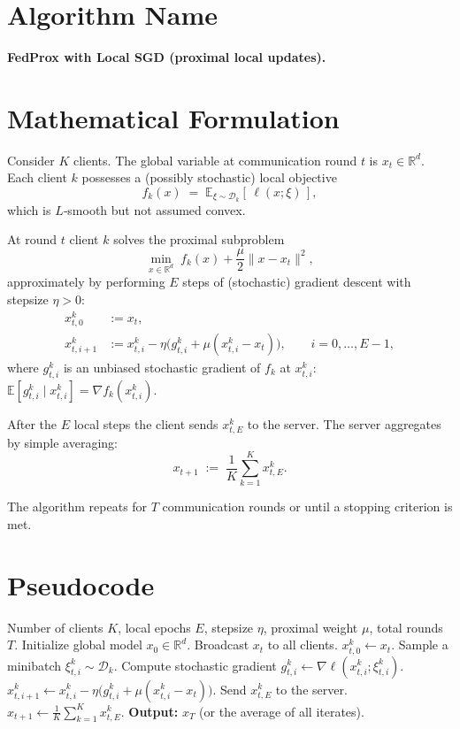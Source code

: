 \documentclass{article}
\newcommand{\EE}{\mathbb{E}}
\newcommand{\RR}{\mathbb{R}}
\begin{document}
\section*{Algorithm Name}
\textbf{FedProx with Local SGD (proximal local updates).}

\section*{Mathematical Formulation}
Consider $K$ clients.  The global variable at communication round $t$ is $x_t\in\RR^d$.  
Each client $k$ possesses a (possibly stochastic) local objective 
\[
f_k(x)\;=\;\EE_{\xi\sim\mathcal{D}_k}[\,\ell(x;\xi)\,],
\]
which is $L$‑smooth but not assumed convex.  

At round $t$ client $k$ solves the proximal subproblem
\[
\min_{x\in\RR^d}\; f_k(x)+\frac{\mu}{2}\|x-x_t\|^2,
\tag{1}
\]
approximately by performing $E$ steps of (stochastic) gradient descent with stepsize $\eta>0$:
\[
\begin{aligned}
x_{t,0}^{k} &:= x_t,\\
x_{t,i+1}^{k} &:= x_{t,i}^{k} - \eta\bigl(g_{t,i}^{k}+ \mu (x_{t,i}^{k}-x_t)\bigr),\qquad i=0,\dots,E-1,
\end{aligned}
\tag{2}
\]
where $g_{t,i}^{k}$ is an unbiased stochastic gradient of $f_k$ at $x_{t,i}^{k}$:
$\EE[g_{t,i}^{k}\mid x_{t,i}^{k}]=\nabla f_k(x_{t,i}^{k})$.  

After the $E$ local steps the client sends $x_{t,E}^{k}$ to the server.  
The server aggregates by simple averaging:
\[
x_{t+1}\;:=\;\frac1K\sum_{k=1}^{K}x_{t,E}^{k}.
\tag{3}
\]

The algorithm repeats for $T$ communication rounds or until a stopping criterion is met.

\section*{Pseudocode}
\begin{algorithm}[H]
\caption{FedProx with Local SGD}
\begin{algorithmic}[1]
\Require Number of clients $K$, local epochs $E$, stepsize $\eta$, proximal weight $\mu$, total rounds $T$.
\State Initialize global model $x_0\in\RR^d$.
    \State Broadcast $x_t$ to all clients.
        \State $x_{t,0}^{k}\gets x_t$.
            \State Sample a minibatch $\xi_{t,i}^{k}\sim\mathcal D_k$.
            \State Compute stochastic gradient $g_{t,i}^{k}\gets \nabla\ell(x_{t,i}^{k};\xi_{t,i}^{k})$.
            \State $x_{t,i+1}^{k}\gets x_{t,i}^{k}-\eta\bigl(g_{t,i}^{k}+ \mu (x_{t,i}^{k}-x_t)\bigr)$.
        \EndFor
        \State Send $x_{t,E}^{k}$ to the server.
    \EndFor
    \State $x_{t+1}\gets \frac1K\sum_{k=1}^{K}x_{t,E}^{k}$.
\EndFor
\State \textbf{Output:} $x_T$ (or the average of all iterates).
\end{algorithmic}
\end{algorithm}
\end{document}

